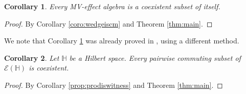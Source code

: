 \documentclass[letterpaper]{amsart}
\newtheorem{corollary}{Corollary}
\theoremstyle{definition}
\begin{document}
\begin{corollary}\label{coro:mviscoex}
Every MV-effect algebra is a coexistent subset of itself.
\end{corollary}
\begin{proof}
By Corollary \ref{coro:wedgeiscm} and Theorem \ref{thm:main}.
\end{proof}
We note that Corollary \ref{coro:mviscoex} was already proved in \cite{Jen:BARGbMVEA},
using a different method.
\begin{corollary}
Let $\mathbb H$ be a Hilbert space.
Every pairwise commuting subset of $\mathcal E(\mathbb H)$ is coexistent.
\end{corollary}
\begin{proof}
By Corollary \ref{prop:prodiswitness} and Theorem \ref{thm:main}.
\end{proof}
%
%
\end{document}
